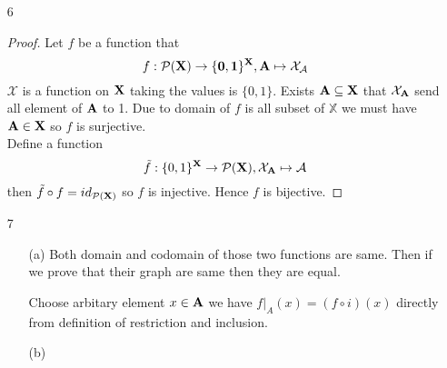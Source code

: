 \documentclass[11pt]{book}
\newcommand{\bb}[1]{\mathbb{#1}}
\newcommand{\ra}{\rightarrow}
\begin{document}
\begin{enumerate}
\begin{enumerate}
\begin{proof}
                so $(f \circ g)$ is injective. Prove of surjective is similar.
                \end{proof}
          \item[(b)]
                \begin{proof}
                If $f$ is injective then there exists a unique function $\tilde{f}: im(f) \ra X$
                such that $\tilde{f} \circ f = id_{\bf{X}}$. Then define function $\Tilde{f}$ in a
                way that $\Tilde{f}\vert_{im(f)} = \tilde{f}$. Finally, we got a
                function that $\Tilde{f} \circ f = id_{\bf{x}}$
                \end{proof}
          \item[(c)]
                \begin{proof}
                Similar to (b).
                \end{proof}
        \end{enumerate}
  \item[6]
        \begin{proof}
          Let $f$ be a function that
          $$f: \cal{P}(\bf{X}) \ra \{0,1\}^{\bf{X}}, A \mapsto \cal{X}_{A}$$
          $\mathcal{X}$ is a function on $\bf{X}$ taking the values is $\{0,1\}$.
          Exists $\bf{A} \subseteq \bf{X}$ that $\cal{X}_{\bf{A}}$ send all element
          of $\bf{A}$ to 1. Due to domain of $f$ is all subset of $\bb{X}$ we must have
          $\bf{A} \in \bf{X}$ so $f$ is surjective.\\

          Define a function
          $$\Tilde{f}: \{0,1\}^{\bf{X}} \ra \cal{P}(\bf{X}),\cal{X}_{\bf{A}} \mapsto A$$
          then $\Tilde{f} \circ f = id_{\cal{P}(\bf{X})}$ so $f$ is injective. Hence $f$ is
          bijective.
        \end{proof}
  \item[7]
        \begin{enumerate}
          \item[(a)]
                Both domain and codomain of those two functions are same. Then if we prove that their graph are same then they are equal.

                Choose arbitary element $x \in \bf{A}$ we have $f\vert_{A}(x) = (f \circ i)(x)$ directly from definition of restriction and inclusion.
          \item[(b)]

        \end{enumerate}
\end{enumerate}
\end{document}
